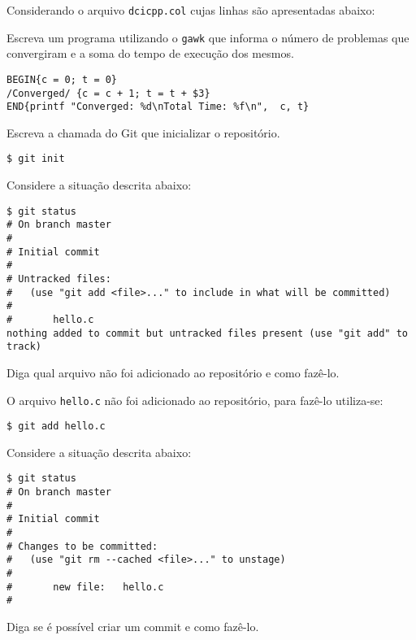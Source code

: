 \begin{Exercise}[label={0007}, difficulty={2}, origin={gawk}]
  Considerando o arquivo \lstinline+dcicpp.col+ cujas linhas são
  apresentadas abaixo:
  
  Escreva um programa utilizando o \lstinline+gawk+ que informa o número de
  problemas que convergiram e a soma do tempo de execução dos mesmos.
\end{Exercise}
\begin{Answer}[ref={007}]
  \begin{lstlisting}
BEGIN{c = 0; t = 0}
/Converged/ {c = c + 1; t = t + $3}
END{printf "Converged: %d\nTotal Time: %f\n",  c, t}
  \end{lstlisting}
\end{Answer}
\begin{Exercise}[label={0008}, difficulty={1}, origin={git}]
  Escreva a chamada do Git que inicializar o repositório.
\end{Exercise}
\begin{Answer}[ref={0008}]
  \begin{lstlisting}
$ git init
  \end{lstlisting}
\end{Answer}
\begin{Exercise}[label={0009}, difficulty={1}, origin={git}]
  Considere a situação descrita abaixo:
  \begin{lstlisting}
$ git status
# On branch master
#
# Initial commit
#
# Untracked files:
#   (use "git add <file>..." to include in what will be committed)
#
#       hello.c
nothing added to commit but untracked files present (use "git add" to track)
  \end{lstlisting}
  Diga qual arquivo não foi adicionado ao repositório e como fazê-lo.
\end{Exercise}
\begin{Answer}[ref={0009}]
  O arquivo \lstinline+hello.c+ não foi adicionado ao repositório, para fazê-lo
  utiliza-se:
  \begin{lstlisting}
$ git add hello.c
  \end{lstlisting}
\end{Answer}
\begin{Exercise}[label={0010}, difficulty={1}, origin={git}]
  Considere a situação descrita abaixo:
  \begin{lstlisting}
$ git status
# On branch master
#
# Initial commit
#
# Changes to be committed:
#   (use "git rm --cached <file>..." to unstage)
#
#       new file:   hello.c
#
  \end{lstlisting}
  Diga se é possível criar um commit e como fazê-lo.
\end{Exercise}
